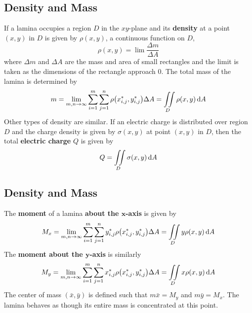 \documentclass[../Calculus \Roman{3}.tex]{subfiles}
\begin{document}
		\subsection*{Density and Mass}
			If a lamina occupies a region $D$ in the $xy$-plane and its \textbf{density} at a point $(x, y)$ in $D$ is given by $\rho(x, y)$, a continuous function on $D$, 
				\[\rho(x, y) = \lim\frac{\Delta m}{\Delta A}\]
				where $\Delta m$ and $\Delta A$ are the mass and area of small rectangles and the limit is taken as the dimensions of the rectangle approach 0. The total mass of the lamina is determined by
				\[
					m = \lim_{m, n \to \infty}\sum_{i = 1}^m\sum_{j = 1}^n\rho\bigl(x_{i,j}^*, y_{i, j}^*\bigr)\Delta A
							= \iint\limits_D\rho(x, y)\,\mathrm{d} A
				\]
			Other types of density are similar. If an electric charge is distributed over region $D$ and the charge density is given by $\sigma(x, y)$ at point $(x, y)$ in $D$, then the total \textbf{electric charge} $Q$ is given by
				\[Q = \iint\limits_D\sigma(x, y)\,\mathrm{d} A\]
		\subsection*{Density and Mass}
			The \textbf{moment} of a lamina \textbf{about the $\bm{x}$-axis} is given by
				\[
					M_x = \lim_{m, n \to \infty}\sum_{i = 1}^m\sum_{j = 1}^n y_{i, j}^*\rho\bigl(x_{i, j}^*, y_{i, j}^*\bigr)\Delta A
							= \iint\limits_D y\rho(x, y)\,\mathrm{d} A
				\]
				The \textbf{moment about the $\bm{y}$-axis} is similarly
					\[
						M_y = \lim_{m, n \to \infty}\sum_{i = 1}^m\sum_{j = 1}^n x_{i, j}^*\rho\bigl(x_{i, j}^*, y_{i, j}^*\bigr)\Delta A
								= \iint\limits_D x\rho(x, y)\,\mathrm{d} A
					\]
			The center of mass $(\bar{x}, \bar{y})$ is defined such that $m\bar{x} = M_y$ and $m\bar{y} = M_x$. The lamina behaves as though its entire mass is concentrated at this point.
\end{document}
